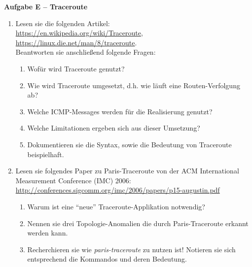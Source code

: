 \documentclass[paper=a4,fontsize=11pt]{scrartcl}%
\numberwithin{equation}{section}
\begin{document}
\begin{center}\Large{\textbf{Aufgabe E -- Traceroute}}\end{center}\vskip0.2in
\begin{enumerate}
	\item Lesen sie die folgenden Artikel:\\
	\url{https://en.wikipedia.org/wiki/Traceroute},\\
	\url{https://linux.die.net/man/8/traceroute}.\\
	Beantworten sie anschließend folgende Fragen:
	\begin{enumerate}
		\item Wofür wird Traceroute genutzt?
		\item Wie wird Traceroute umgesetzt, d.h. wie läuft eine Routen-Verfolgung ab? 
		\item Welche ICMP-Messages werden für die Realisierung genutzt?
		\item Welche Limitationen ergeben sich aus dieser Umsetzung?
		\item Dokumentieren sie die Syntax, sowie die Bedeutung von Traceroute beispielhaft.
	\end{enumerate}
	\item Lesen sie folgendes Paper zu Paris-Traceroute \cite{Augustin2006ATA} von der ACM International Measurement Conference (IMC) 2006:\\
	\url{http://conferences.sigcomm.org/imc/2006/papers/p15-augustin.pdf}
	\begin{enumerate}
		\item Warum ist eine \enquote{neue} Traceroute-Applikation notwendig?
		\item Nennen sie drei Topologie-Anomalien die durch Paris-Traceroute erkannt werden kann.
		\item Recherchieren sie wie \emph{paris-traceroute} zu nutzen ist! Notieren sie sich entsprechend die Kommandos und deren Bedeutung.
	\end{enumerate}
\end{enumerate}	
\end{document}

